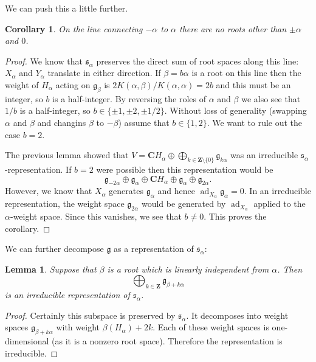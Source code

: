 \documentclass[12pt]{article}
\newcommand{\CC}{\mathbf{C}}
\newcommand{\ZZ}{\mathbf{Z}}
\newcommand{\OP}{\operatorname}
\newcommand{\ad}{\OP{ad}}
\newtheorem{lma}[thm]{Lemma}
\newtheorem{cor}[thm]{Corollary}
\theoremstyle{definition}
\theoremstyle{check}
\theoremstyle{remark}
\theoremstyle{TheoremNum}
\begin{document}
We can push this a little further.
\begin{cor}
On the line connecting $-\alpha$ to $\alpha$ there are no roots other than $\pm\alpha$ and $0$.
\end{cor}
\begin{proof}
We know that $\mathfrak{s}_{\alpha}$ preserves the direct sum of root spaces along this line: $X_{\alpha}$ and $Y_{\alpha}$ translate in either direction. If $\beta=b\alpha$ is a root on this line then the weight of $H_{\alpha}$ acting on $\mathfrak{g}_{\beta}$ is $2K(\alpha,\beta)/K(\alpha,\alpha)=2b$ and this must be an integer, so $b$ is a half-integer. By reversing the roles of $\alpha$ and $\beta$ we also see that $1/b$ is a half-integer, so $b\in\{\pm 1,\pm 2,\pm 1/2\}$. Without loss of generality (swapping $\alpha$ and $\beta$ and changins $\beta$ to $-\beta$) assume that $b\in\{1,2\}$. We want to rule out the case $b=2$.

The previous lemma showed that $V=\CC H_{\alpha}\oplus\bigoplus_{k\in\ZZ\setminus\{0\}}\mathfrak{g}_{k\alpha}$ was an irreducible $\mathfrak{s}_{\alpha}$-representation. If $b=2$ were possible then this representation would be
\[\mathfrak{g}_{-2\alpha}\oplus\mathfrak{g}_{\alpha}\oplus\CC H_{\alpha}\oplus\mathfrak{g}_{\alpha}\oplus\mathfrak{g}_{2\alpha}.\]
However, we know that $X_{\alpha}$ generates $\mathfrak{g}_{\alpha}$ and hence $\ad_{X_{\alpha}}\mathfrak{g}_{\alpha}=0$. In an irreducible representation, the weight space $\mathfrak{g}_{2\alpha}$ would be generated by $\ad_{X_{\alpha}}$ applied to the $\alpha$-weight space. Since this vanishes, we see that $b\neq 0$. This proves the corollary.
\end{proof}

We can further decompose $\mathfrak{g}$ as a representation of $\mathfrak{s}_{\alpha}$:
\begin{lma}
Suppose that $\beta$ is a root which is linearly independent from $\alpha$. Then
\[\bigoplus_{k\in\ZZ}\mathfrak{g}_{\beta+k\alpha}\]
is an irreducible representation of $\mathfrak{s}_{\alpha}$.
\end{lma}
\begin{proof}
Certainly this subspace is preserved by $\mathfrak{s}_{\alpha}$. It decomposes into weight spaces $\mathfrak{g}_{\beta+k\alpha}$ with weight $\beta(H_{\alpha})+2k$. Each of these weight spaces is one-dimensional (as it is a nonzero root space). Therefore the representation is irreducible.
\end{proof}
\end{document}
